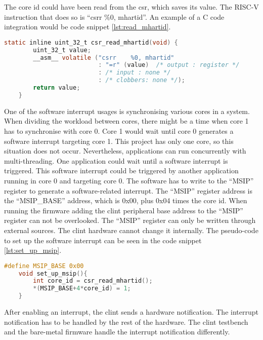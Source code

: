 The core id could have been read from the \acrshort{csr}, which saves its value. The RISC-V instruction that does so is \enquote{csrr    \%0, mhartid}. An example of a C code integration would be code snippet \ref*{lst:read_mhartid}.

\begin{lstlisting}[language=C, caption={Read core id from \acrshort{csr}.}, label=lst:read_mhartid]
    static inline uint_32_t csr_read_mhartid(void) {
        uint_32_t value;        
        __asm__ volatile ("csrr    %0, mhartid"
                          : "=r" (value)  /* output : register */
                          : /* input : none */
                          : /* clobbers: none */);
        return value;
    }
\end{lstlisting}

One of the software interrupt usages is synchronising various cores in a system. When dividing the workload between cores, there might be a time when core 1 has to synchronise with core 0. Core 1 would wait until core 0 generates a software interrupt targeting core 1. This project has only one core, so this situation does not occur. Nevertheless, applications can run concurrently with multi-threading. One application could wait until a software interrupt is triggered. This software interrupt could be triggered by another application running in core 0 and targeting core 0. The software has to write to the \enquote{MSIP} register to generate a software-related interrupt. The \enquote{MSIP} register address is the \enquote{MSIP\_BASE} address, which is 0x00, plus 0x04 times the core id. When running the firmware adding the \acrshort{clint} peripheral base address to the \enquote{MSIP} register can not be overlooked. The \enquote{MSIP} register can only be written through external sources. The \acrshort{clint} hardware cannot change it internally. The pseudo-code to set up the software interrupt can be seen in the code snippet \ref*{lst:set_up_msip}.

\begin{lstlisting}[language=C, caption={Set Up Software Interrupt.}, label=lst:set_up_msip]
    #define MSIP_BASE 0x00
    void set_up_msip(){
        int core_id = csr_read_mhartid();
        *(MSIP_BASE+4*core_id) = 1;
    }
\end{lstlisting}

After enabling an interrupt, the \acrshort{clint} sends a hardware notification. The interrupt notification has to be handled by the rest of the hardware. The \acrshort{clint} testbench and the bare-metal firmware handle the interrupt notification differently.

